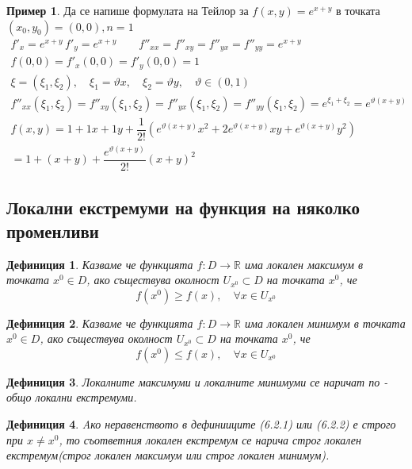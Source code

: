 \documentclass[a4paper,fleqn,12pt]{article}
\newtheorem{definition}{Дефиниция}[subsection]
\theoremstyle{definition}
\newtheorem{example}{Пример}[subsection]
\begin{document}
\begin{example}
Да се напише формулата на Тейлор за $f(x,y) = e^{x+y}$ в точката $(x_0,y_0) = (0,0), n = 1$\\
\begin{gather*}
f'_x = e^{x+y}\,  f'_y = e^{x+y} \qquad f''_{xx} = f''_{xy} = f''_{yx} = f''_{yy} =  e^{x+y}\\
f(0,0) = f'_x (0,0) = f'_y(0,0) = 1 \\
\xi = (\xi_1, \xi_2), \quad \xi_1 = \vartheta x, \quad \xi_2 = \vartheta y, \quad \vartheta \in (0,1)\\
f''_{xx}(\xi_1, \xi_2) = f''_{xy}(\xi_1, \xi_2) = f''_{yx}(\xi_1, \xi_2) = f''_{yy}(\xi_1, \xi_2) =  e^{\xi_1 + \xi_2} =  e^{\vartheta(x+y)}\\
f(x,y) = 1 + 1x + 1y + \dfrac{1}{2!} \left(e^{\vartheta(x+y)}x^2 + 2e^{\vartheta(x+y)}xy + e^{\vartheta(x+y)}y^2 \right)\\
= 1+(x+y) + \dfrac{e^{\vartheta(x+y)}}{2!}(x+y)^2
\end{gather*}
\end{example}

\subsection{Локални екстремуми на функция на няколко променливи}

\begin{definition}
Казваме че функцията $f: D \to \mathbb{R}$ има локален максимум в точката $x^0 \in D$, ако съществува околност $U_{x^0} \subset D$ на точката $x^0$, че
$$f(x^0) \geq f(x), \quad \forall x \in U_{x^0}$$
\end{definition}

\begin{definition}
Казваме че функцията $f: D \to \mathbb{R}$ има локален минимум в точката $x^0 \in D$, ако съществува околност $U_{x^0} \subset D$ на точката $x^0$, че
$$f(x^0) \leq f(x), \quad \forall x \in U_{x^0}$$
\end{definition}

\begin{definition}
Локалните максимуми и локалните минимуми се наричат по - общо локални екстремуми. 
\end{definition}


\begin{definition}
Aко неравенството в дефинииците (6.2.1) или (6.2.2)  е строго при $x \neq x^0$, то съответния локален екстремум се нарича строг локален екстремум(строг локален максимум или строг локален минимум).
\end{definition}
\end{document}
